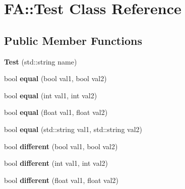 \hypertarget{classFA_1_1Test}{\section{F\-A\-:\-:Test Class Reference}
\label{classFA_1_1Test}
}
\subsection*{Public Member Functions}
\begin{DoxyCompactItemize}
\item 
\hypertarget{classFA_1_1Test_a58b2c4fe3f650a4e76bd101d1d7aa047}{{\bfseries Test} (std\-::string name)}\label{classFA_1_1Test_a58b2c4fe3f650a4e76bd101d1d7aa047}

\item 
\hypertarget{classFA_1_1Test_a60b26fe3a247c5aa551bf1c188546d08}{bool {\bfseries equal} (bool val1, bool val2)}\label{classFA_1_1Test_a60b26fe3a247c5aa551bf1c188546d08}

\item 
\hypertarget{classFA_1_1Test_aefd87465e9eca64b8eafaf991d2b55d4}{bool {\bfseries equal} (int val1, int val2)}\label{classFA_1_1Test_aefd87465e9eca64b8eafaf991d2b55d4}

\item 
\hypertarget{classFA_1_1Test_a356b78edf6d11eec964853cafa6814cd}{bool {\bfseries equal} (float val1, float val2)}\label{classFA_1_1Test_a356b78edf6d11eec964853cafa6814cd}

\item 
\hypertarget{classFA_1_1Test_a2ab715d764af951d76c3ee36d2c9c1a4}{bool {\bfseries equal} (std\-::string val1, std\-::string val2)}\label{classFA_1_1Test_a2ab715d764af951d76c3ee36d2c9c1a4}

\item 
\hypertarget{classFA_1_1Test_ab939b7a658dbb6e1fce3d49b039a80db}{bool {\bfseries different} (bool val1, bool val2)}\label{classFA_1_1Test_ab939b7a658dbb6e1fce3d49b039a80db}

\item 
\hypertarget{classFA_1_1Test_af09738438afe9774fb802102ee371b54}{bool {\bfseries different} (int val1, int val2)}\label{classFA_1_1Test_af09738438afe9774fb802102ee371b54}

\item 
\hypertarget{classFA_1_1Test_a2825eec59b4b8c14a227419bfec91760}{bool {\bfseries different} (float val1, float val2)}\label{classFA_1_1Test_a2825eec59b4b8c14a227419bfec91760}


\end{DoxyCompactItemize}
